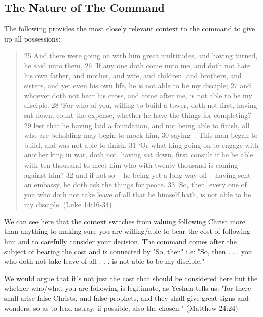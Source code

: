 \documentclass[11pt]{article}
\begin{document}
\subsection{The Nature of The Command}
The following provides the most closely relevant context to the command to give up all possessions:
\begin{quote}
25 And there were going on with him great multitudes, and having turned, he said unto them,
26 `If any one doth come unto me, and doth not hate his own father, and mother, and wife, and children, and brothers, and sisters, and yet even his own life, he is not able to be my disciple;
27 and whoever doth not bear his cross, and come after me, is not able to be my disciple.
28 `For who of you, willing to build a tower, doth not first, having sat down, count the expense, whether he have the things for completing?
29 lest that he having laid a foundation, and not being able to finish, all who are beholding may begin to mock him,
30 saying -- This man began to build, and was not able to finish.
31 `Or what king going on to engage with another king in war, doth not, having sat down, first consult if he be able with ten thousand to meet him who with twenty thousand is coming against him?
32 and if not so -- he being yet a long way off -- having sent an embassy, he doth ask the things for peace.
33 `So, then, every one of you who doth not take leave of all that he himself hath, is not able to be my disciple. (Luke 14:16-34)
\end{quote}
We can see here that the context switches from valuing following Christ more than anything to making sure you are willing/able to bear the cost of following him and to carefully consider your decision. The command comes after the subject of bearing the cost and is connected by "So, then" i.e: "So, then . . . you who doth not take leave of all . . . is not able to be my disciple." 

We would argue that it's not just the cost that should be considered here but the whether who/what you are following is legitimate, as Yeshua tells us: "for there shall arise false Christs, and false prophets, and they shall give great signs and wonders, so as to lead astray, if possible, also the chosen." (Matthew 24:24) 
\end{document}
